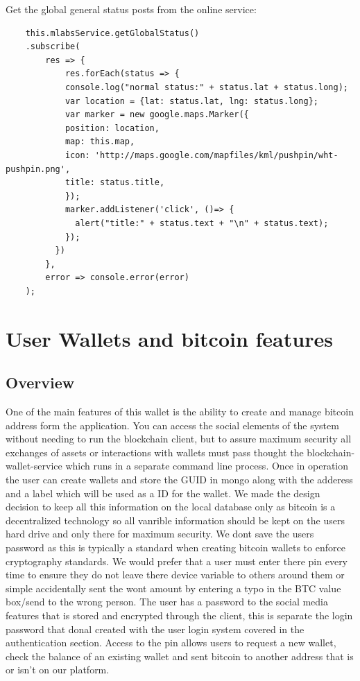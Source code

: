 Get the global general status posts from the online service:
\begin{lstlisting}
    this.mlabsService.getGlobalStatus()
    .subscribe(
        res => {
            res.forEach(status => {
            console.log("normal status:" + status.lat + status.long);
            var location = {lat: status.lat, lng: status.long};
            var marker = new google.maps.Marker({
            position: location, 
            map: this.map,
            icon: 'http://maps.google.com/mapfiles/kml/pushpin/wht-pushpin.png',
            title: status.title,
            });
            marker.addListener('click', ()=> {
              alert("title:" + status.text + "\n" + status.text);
            }); 
          })  
        },
        error => console.error(error)
    );
\end{lstlisting}
\section{User Wallets and bitcoin features}

\subsection{Overview}
One of the main features of this wallet is the ability to create and manage bitcoin address form the application. You can access the social elements of the system without needing to run the blockchain client, but to assure maximum security all exchanges of assets or interactions with wallets must pass thought the blockchain-wallet-service which runs in a separate command line process. Once in operation the user can create wallets and store the GUID in mongo along with the adderess and a label which will be used as a ID for the wallet. We made the design decision to keep all this information on the local database only as bitcoin is a decentralized technology so all vanrible information should be kept on the users hard drive and only there for maximum security. We dont save the users password as this is typically a standard when creating bitcoin wallets to enforce cryptography standards. We would prefer that a user must enter there pin every time to ensure they do not leave there device variable to others around them or simple accidentally sent the wont amount by entering a typo in the BTC value box/send to the wrong person. The user has a password to the social media features that is stored and encrypted through the client, this is separate the login password that donal created with the user login system covered in the authentication section. Access to the pin allows users to request a new wallet, check the balance of an existing wallet and sent bitcoin to another address that is or isn't on our platform.

